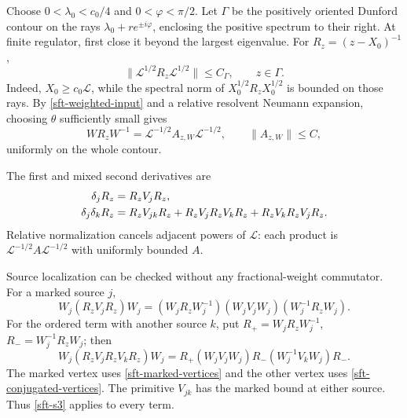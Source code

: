Choose \(0<\lambda_0<c_0/4\) and \(0<\varphi<\pi/2\).
Let \(\Gamma\) be the positively oriented Dunford contour on the
rays \(\lambda_0+r e^{\pm i\varphi}\), enclosing the positive
spectrum to their right. At finite regulator, first close it beyond
the largest eigenvalue. For \(R_z=(z-X_0)^{-1}\),
\begin{equation}
 \|\mathcal L^{1/2}R_z\mathcal L^{1/2}\|\le C_\Gamma,
 \qquad z\in\Gamma .
 \label{sft-contour-bound}
\end{equation}
Indeed, \(X_0\ge c_0\mathcal L\), while the spectral norm of
\(X_0^{1/2}R_zX_0^{1/2}\) is bounded on those rays.
By \eqref{sft-weighted-input} and a relative resolvent Neumann
expansion, choosing \(\theta\) sufficiently small gives
\begin{equation}
 WR_zW^{-1}=\mathcal L^{-1/2}A_{z,W}\mathcal L^{-1/2},
 \qquad \|A_{z,W}\|\le C ,
 \label{sft-twisted-resolvent}
\end{equation}
uniformly on the whole contour.

The first and mixed second derivatives are
\begin{align}
 \delta_jR_z&=R_zV_jR_z,\notag\\
 \delta_j\delta_kR_z
  &=R_zV_{jk}R_z+R_zV_jR_zV_kR_z+R_zV_kR_zV_jR_z.
 \label{sft-resolvent-derivatives}
\end{align}
Relative normalization cancels adjacent powers of \(\mathcal L\):
each product is \(\mathcal L^{-1/2}A\mathcal L^{-1/2}\)
with uniformly bounded \(A\).

Source localization can be checked without any fractional-weight
commutator. For a marked source \(j\),
\begin{equation}
 W_j(R_zV_jR_z)W_j
 =(W_jR_zW_j^{-1})(W_jV_jW_j)(W_j^{-1}R_zW_j).
 \label{sft-marked-first}
\end{equation}
For the ordered term with another source \(k\), put
\(R_+=W_jR_zW_j^{-1}\), \(R_-=W_j^{-1}R_zW_j\); then
\begin{equation}
 W_j(R_zV_jR_zV_kR_z)W_j
 =R_+(W_jV_jW_j)R_-(W_j^{-1}V_kW_j)R_-.
 \label{sft-marked-second}
\end{equation}
The marked vertex uses \eqref{sft-marked-vertices} and the other
vertex uses \eqref{sft-conjugated-vertices}. The primitive
\(V_{jk}\) has the marked bound at either source. Thus
\eqref{sft-s3} applies to every term.

